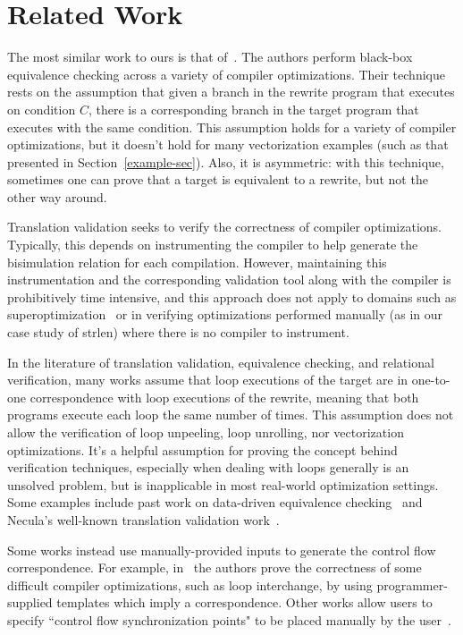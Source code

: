 \section{Related Work}

The most similar work to ours is that of~\cite{Dahiya17ASPLAS}. The
authors perform black-box equivalence checking across a variety of
compiler optimizations. Their technique rests on the assumption that
given a branch in the rewrite program that executes on condition $C$,
there is a corresponding branch in the target program that executes
with the same condition. This assumption holds for a variety of
compiler optimizations, but it doesn't hold for many vectorization
examples (such as that presented in Section~\ref{example-sec}). Also,
it is asymmetric: with this technique, sometimes one can prove that a
target is equivalent to a rewrite, but not the other way around.

Translation validation seeks to verify the correctness of compiler
optimizations. Typically, this depends on instrumenting the compiler
to help generate the bisimulation relation for each compilation.
However, maintaining this instrumentation and the corresponding
validation tool along with the compiler is prohibitively time
intensive, and this approach does not apply to domains such as
superoptimization~\cite{Massalin1987,Schkufza2013,Churchill2017} or in
verifying optimizations performed manually (as in our case study of
\libc{} strlen) where there is no compiler to instrument.

In the literature of translation validation, equivalence
checking, and relational verification, many works assume that loop executions
of the target are in one-to-one correspondence with loop executions
of the rewrite, meaning that both programs execute each loop the same
number of times. This assumption does not allow the verification of
loop unpeeling, loop unrolling, nor vectorization optimizations. It's
a helpful assumption for proving the concept behind verification
techniques, especially when dealing with loops generally is an
unsolved problem, but is inapplicable in most real-world optimization
settings. Some examples include past work on data-driven equivalence
checking~\cite{Sharma2013} and Necula's well-known translation
validation work~\cite{Necula2000}.

Some works instead use manually-provided inputs to generate the
control flow correspondence. For example, in~\cite{Kundu2009}
the authors prove the correctness of some difficult compiler
optimizations, such as loop interchange, by using programmer-supplied
templates which imply a correspondence. Other works allow users to
specify ``control flow synchronization points" to be placed manually
by the user~\cite{Kiefer2016}.

